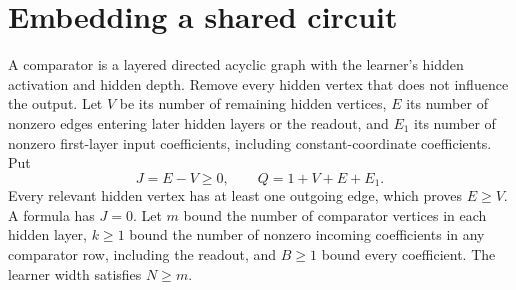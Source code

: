 \section{Embedding a shared circuit}
\label{sec:shared-dag}
A comparator is a layered directed acyclic graph with the learner's hidden activation and hidden depth. Remove every hidden vertex that does not influence the output. Let $V$ be its number of remaining hidden vertices, $E$ its number of nonzero edges entering later hidden layers or the readout, and $E_1$ its number of nonzero first-layer input coefficients, including constant-coordinate coefficients. Put
\[
 J=E-V\ge0,\qquad Q=1+V+E+E_1.
\]
Every relevant hidden vertex has at least one outgoing edge, which proves $E\ge V$. A formula has $J=0$. Let $m$ bound the number of comparator vertices in each hidden layer, $k\ge1$ bound the number of nonzero incoming coefficients in any comparator row, including the readout, and $B\ge1$ bound every coefficient. The learner width satisfies $N\ge m$.

